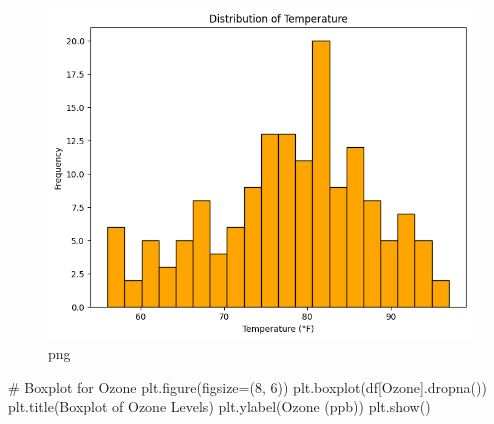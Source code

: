 \documentclass[
  letterpaper,
  DIV=11,
  numbers=noendperiod]{scrreprt}
\newenvironment{Shaded}{\begin{snugshade}}{\end{snugshade}}
\newcommand{\CommentTok}[1]{\textcolor[rgb]{0.37,0.37,0.37}{#1}}
\newcommand{\DecValTok}[1]{\textcolor[rgb]{0.68,0.00,0.00}{#1}}
\newcommand{\NormalTok}[1]{\textcolor[rgb]{0.00,0.23,0.31}{#1}}
\newcommand{\OperatorTok}[1]{\textcolor[rgb]{0.37,0.37,0.37}{#1}}
\newcommand{\StringTok}[1]{\textcolor[rgb]{0.13,0.47,0.30}{#1}}
\begin{document}
\begin{figure}[H]

{\centering \includegraphics{Tut2_Python_Olufawo_09_21_24_files/Tut2_Python_Olufawo_09_21_24_8_0.png}

}

\caption{png}

\end{figure}%

\begin{Shaded}
\begin{Highlighting}[]
\CommentTok{\# Boxplot for Ozone}
\NormalTok{plt.figure(figsize}\OperatorTok{=}\NormalTok{(}\DecValTok{8}\NormalTok{, }\DecValTok{6}\NormalTok{))}
\NormalTok{plt.boxplot(df[}\StringTok{\textquotesingle{}Ozone\textquotesingle{}}\NormalTok{].dropna())}
\NormalTok{plt.title(}\StringTok{\textquotesingle{}Boxplot of Ozone Levels\textquotesingle{}}\NormalTok{)}
\NormalTok{plt.ylabel(}\StringTok{\textquotesingle{}Ozone (ppb)\textquotesingle{}}\NormalTok{)}
\NormalTok{plt.show()}

\end{Highlighting}
\end{Shaded}
\end{document}
